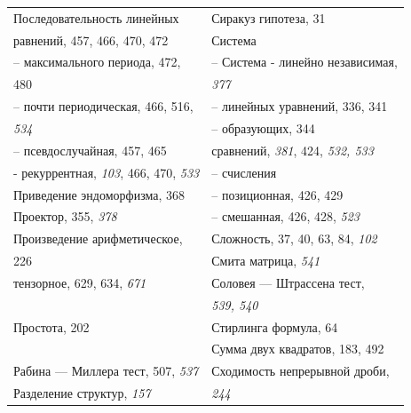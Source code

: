 \documentclass{mai_book}
\begin{document}
{\begin{tabular}{ll}
			Последовательность линейных & Сиракуз гипотеза, 31 \\
			равнений, 457, 466, 470, 472 & Система \\
			-- максимального периода, 472, & -- Система
- линейно независимая,  \\
			480 & \emph{377} \\
			-- почти периодическая, 466, 516, & -- линейных уравнений, 336, 341 \\
			\emph{534} & -- образующих, 344 \\
			-- псевдослучайная, 457, 465 &  сравнений, \emph{381}, 424, {\itshape 532, 533} \\
			- рекуррентная, \emph{103}, 466, 470, \emph{533} & -- счисления \\
			Приведение эндоморфизма, 368 & -- позиционная, 426, 429 \\
			Проектор, 355, \emph{378} & -- смешанная, 426, 428, \emph{523} \\
			Произведение арифметическое, & Сложность, 37, 40, 63, 84, \emph{102} \\
			226 & Смита матрица, \emph{541} \\
			 тензорное, 629, 634, \emph{671} & Соловея — Штрассена тест, \\
			& {\itshape 539, 540}\\
			Простота, 202 & Стирлинга формула, 64 \\
			& Сумма двух квадратов, 183, 492 \\
			
Рабина — Миллера тест, 507, \emph{537} & Сходимость непрерывной дроби, \\
			Разделение структур, \emph{157} & \emph{244}\\
\end{tabular}

}
\end{document}
